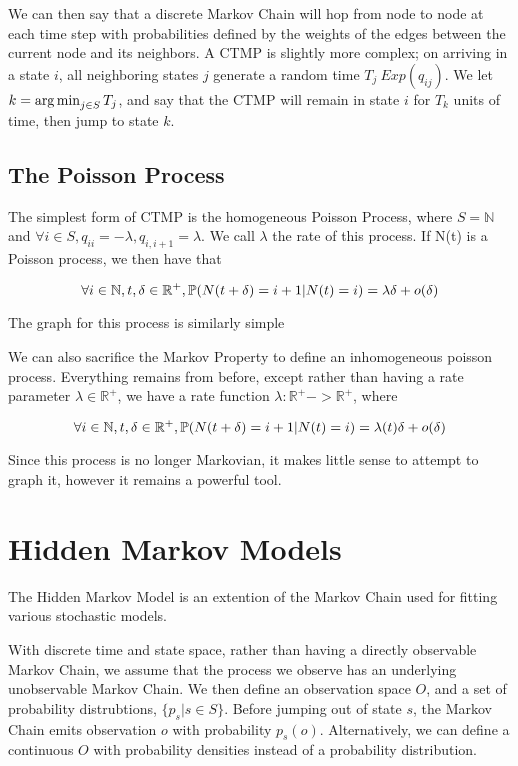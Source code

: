 We can then say that a discrete Markov Chain will hop from node to node at each time step with probabilities defined by the weights of the edges between the current node and its neighbors. A CTMP is slightly more complex; on arriving in a state $i$, all neighboring states $j$ generate a random time $T_j ~ Exp(q_{ij})$. We let $k = \operatorname*{arg\,min}_{j\in S} T_j$, and say that the CTMP will remain in state $i$ for $T_k$ units of time, then jump to state $k$.

\subsection{The Poisson Process}

The simplest form of CTMP is the homogeneous Poisson Process, where $S = \mathbb{N}$ and $\forall i \in S, q_{ii}=-\lambda, q_{i,i+1} = \lambda$. We call $\lambda$ the rate of this process. If N(t) is a Poisson process, we then have that

$$
\forall i \in \mathbb{N}, t,\delta \in \mathbb{R}^{+}, \mathbb{P} (N(t+\delta) = i+1 | N(t) = i) = \lambda \delta + o(\delta)
$$

The graph for this process is similarly simple

We can also sacrifice the Markov Property to define an inhomogeneous poisson process. Everything remains from before, except rather than having a rate parameter $\lambda \in \mathbb{R}^{+}$, we have a rate function $\lambda : \mathbb{R}^{+} -> \mathbb{R}^{+}$, where

$$
\forall i \in \mathbb{N}, t,\delta \in \mathbb{R}^{+}, \mathbb{P} (N(t+\delta) = i+1 | N(t) = i) = \lambda(t) \delta + o(\delta)
$$

Since this process is no longer Markovian, it makes little sense to attempt to graph it, however it remains a powerful tool.

\section{Hidden Markov Models}

The Hidden Markov Model is an extention of the Markov Chain used for fitting various stochastic models.

With discrete time and state space, rather than having a directly observable Markov Chain, we assume that the process we observe has an underlying unobservable Markov Chain. We then define an observation space $O$, and a set of probability distrubtions, $\{p_s | s \in S\}$. Before jumping out of state $s$, the Markov Chain emits observation $o$ with probability $p_s(o)$. Alternatively, we can define a continuous $O$ with probability densities instead of a probability distribution.

